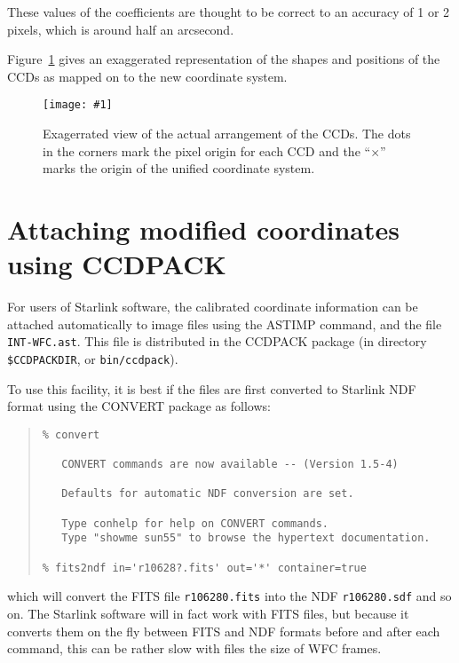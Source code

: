 \documentclass[twoside,11pt]{article}
\newcommand{\htmladdnormallink}[2]{#1}
\newcommand{\htmladdimg}[1]{}
\newcommand{\latexhtml}[2]{#1}
\newcommand{\xref}[3]{#1}
\renewcommand{\_}{\texttt{\symbol{95}}}
\newcommand{\ttsize}{\latexhtml{\small}{}}
\newenvironment{myquote}{\begin{quote}\ttsize}{\end{quote}}
\newcommand{\myfig} [5] {
  \begin{figure}
    \centering\texttt{[image: \#1]}
    \typeout{#1 inserted on page \arabic{page}}
    \caption{\label{#4}#5}
  \end{figure}
  }
\newcommand{\myfig}[5]{
    \htmladdimg{#3}\\
    Figure: \label{#4} #5
    }
\begin{document}
These values of the coefficients are thought to be correct to an
accuracy of 1 or 2 pixels, which is around half an arcsecond.

Figure~\ref{fig:exag} gives an exaggerated representation of the
shapes and positions of the CCDs as mapped on to the new coordinate system.

\myfig{exag4}{}{exag4.gif}{fig:exag}{Exagerrated view of the
actual arrangement of the CCDs.  The dots in the corners mark the
pixel origin for each CCD and the ``$\times$'' marks the origin of
the unified coordinate system.}

\latexhtml{\newpage}{\htmlrule}
\section{Attaching modified coordinates using CCDPACK}

For users of Starlink software,
the calibrated coordinate information can be attached automatically
to image files using the
\htmladdnormallink{ASTIMP}{http://capc23.ast.cam.ac.uk/star/local/docs/sun139.htx/node70.html#xref_ASTIMP}
command, and the file {\tt INT-WFC.ast}.
This file is distributed in the CCDPACK package
(in directory {\tt \$CCDPACK\_DIR}, or {\tt bin/ccdpack}).

To use this facility,
it is best if the files are first converted to Starlink \xref{NDF}{sun33}{}
format using the \xref{CONVERT}{sun55}{} package as follows:
\begin{myquote}
\begin{verbatim}
% convert

   CONVERT commands are now available -- (Version 1.5-4)

   Defaults for automatic NDF conversion are set.

   Type conhelp for help on CONVERT commands.
   Type "showme sun55" to browse the hypertext documentation.

% fits2ndf in='r10628?.fits' out='*' container=true
\end{verbatim}
\end{myquote}
which will convert the FITS file {\tt r106280.fits}
into the NDF {\tt r106280.sdf} and so on.
The Starlink software will in fact work with FITS files,
but because it converts them on the fly between FITS and NDF formats
before and after each command,
this can be rather slow with files the size of WFC frames.
\end{document}
